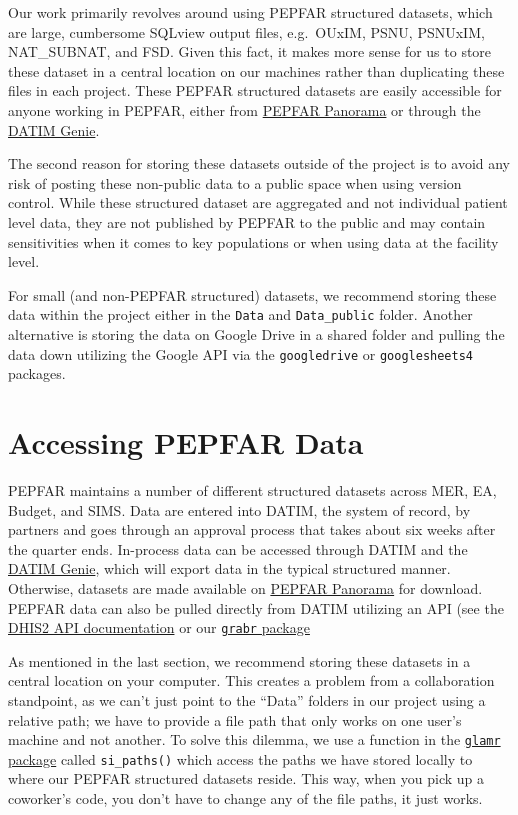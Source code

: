 \documentclass[
  letterpaper,
  DIV=11,
  numbers=noendperiod]{scrreprt}
\begin{document}
Our work primarily revolves around using PEPFAR structured datasets,
which are large, cumbersome SQLview output files, e.g.~OUxIM, PSNU,
PSNUxIM, NAT\_SUBNAT, and FSD. Given this fact, it makes more sense for
us to store these dataset in a central location on our machines rather
than duplicating these files in each project. These PEPFAR structured
datasets are easily accessible for anyone working in PEPFAR, either from
\href{https://pepfar-panorama.org/}{PEPFAR Panorama} or through the
\href{https://www.datim.org/}{DATIM Genie}.

The second reason for storing these datasets outside of the project is
to avoid any risk of posting these non-public data to a public space
when using version control. While these structured dataset are
aggregated and not individual patient level data, they are not published
by PEPFAR to the public and may contain sensitivities when it comes to
key populations or when using data at the facility level.

For small (and non-PEPFAR structured) datasets, we recommend storing
these data within the project either in the \texttt{Data} and
\texttt{Data\_public} folder. Another alternative is storing the data on
Google Drive in a shared folder and pulling the data down utilizing the
Google API via the \texttt{googledrive} or \texttt{googlesheets4}
packages.

\hypertarget{accessing-pepfar-data}{%
\section{Accessing PEPFAR Data}\label{accessing-pepfar-data}}

PEPFAR maintains a number of different structured datasets across MER,
EA, Budget, and SIMS. Data are entered into DATIM, the system of record,
by partners and goes through an approval process that takes about six
weeks after the quarter ends. In-process data can be accessed through
DATIM and the \href{https://www.datim.org/}{DATIM Genie}, which will
export data in the typical structured manner. Otherwise, datasets are
made available on \href{https://pepfar-panorama.org/}{PEPFAR Panorama}
for download. PEPFAR data can also be pulled directly from DATIM
utilizing an API (see the
\href{https://docs.dhis2.org/en/develop/using-the-api/dhis-core-version-240/introduction.html}{DHIS2
API documentation} or our
\href{https://usaid-oha-si.github.io/grabr/}{\texttt{grabr} package}

As mentioned in the last section, we recommend storing these datasets in
a central location on your computer. This creates a problem from a
collaboration standpoint, as we can't just point to the ``Data'' folders
in our project using a relative path; we have to provide a file path
that only works on one user's machine and not another. To solve this
dilemma, we use a function in the
\href{https://usaid-oha-si.github.io/glamr}{\texttt{glamr} package}
called \texttt{si\_paths()} which access the paths we have stored
locally to where our PEPFAR structured datasets reside. This way, when
you pick up a coworker's code, you don't have to change any of the file
paths, it just works.
\end{document}
